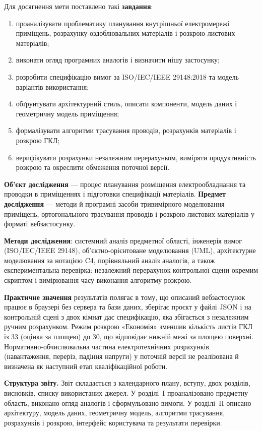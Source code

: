 Для досягнення мети поставлено такі \textbf{завдання}:
\begin{enumerate}[noitemsep, topsep=0.3em, leftmargin=*, label=\arabic*.]
    \item проаналізувати проблематику планування внутрішньої електромережі приміщень, розрахунку оздоблювальних матеріалів і розкрою листових матеріалів;
    \item виконати огляд програмних аналогів і визначити нішу застосунку;
    \item розробити специфікацію вимог за ISO/IEC/IEEE 29148:2018 та модель варіантів використання;
    \item обґрунтувати архітектурний стиль, описати компоненти, модель даних і геометричну модель приміщення;
    \item формалізувати алгоритми трасування проводів, розрахунків матеріалів і розкрою ГКЛ;
    \item верифікувати розрахунки незалежним перерахунком, виміряти продуктивність розкрою та окреслити обмеження поточної версії.
\end{enumerate}

\textbf{Об'єкт дослідження} --- процес планування розміщення електрообладнання та проводки в приміщеннях і підготовки специфікації матеріалів. \textbf{Предмет дослідження} --- методи й програмні засоби тривимірного моделювання приміщень, ортогонального трасування проводів і розкрою листових матеріалів у форматі вебзастосунку.

\textbf{Методи дослідження}: системний аналіз предметної області, інженерія вимог (ISO/IEC/IEEE 29148), об'єктно-орієнтоване моделювання (UML), архітектурне моделювання за нотацією C4, порівняльний аналіз аналогів, а також експериментальна перевірка: незалежний перерахунок контрольної сцени окремим скриптом і вимірювання часу виконання алгоритму розкрою.

\textbf{Практичне значення} результатів полягає в тому, що описаний вебзастосунок працює в браузері без сервера та бази даних, зберігає проєкт у файлі JSON і на контрольній сцені з двох кімнат дає специфікацію, яка збігається з незалежним ручним розрахунком. Режим розкрою «Економія» зменшив кількість листів ГКЛ із 33 (оцінка за площею) до 30, що відповідає нижній межі за площею поверхні. Нормативно-обчислювальна частина електротехнічних розрахунків (навантаження, переріз, падіння напруги) у поточній версії не реалізована й визначена як наступний етап кваліфікаційної роботи.

\textbf{Структура звіту.} Звіт складається з календарного плану, вступу, двох розділів, висновків, списку використаних джерел. У розділі~I проаналізовано предметну область, виконано огляд аналогів і сформульовано вимоги. У розділі~II описано архітектуру, модель даних, геометричну модель, алгоритми трасування, розрахунків і розкрою, інтерфейс користувача та результати перевірки.
